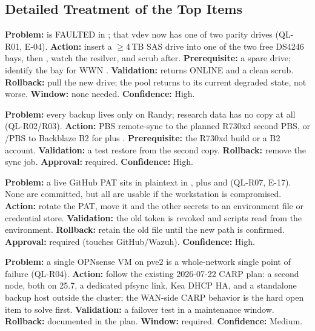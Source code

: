 \subsection{Detailed Treatment of the Top Items}

\begin{callout}[title=QL-REC01 - Replace the faulted bulk drive (Urgent)]
\textbf{Problem:}  is FAULTED in ; that vdev now has one of two parity drives (QL-R01, E-04). \textbf{Action:} insert a $\geq$4\,TB SAS drive into one of the two free DS4246 bays, then , watch the resilver, and scrub after. \textbf{Prerequisite:} a spare drive; identify the bay for WWN . \textbf{Validation:}  returns ONLINE and a clean scrub. \textbf{Rollback:} pull the new drive; the pool returns to its current degraded state, not worse. \textbf{Window:} none needed. \textbf{Confidence:} High.
\end{callout}

\begin{callout}[title=QL-REC03 - Add a second backup copy (Near-term)]
\textbf{Problem:} every backup lives only on Randy;  research data has no copy at all (QL-R02/R03). \textbf{Action:} PBS remote-sync to the planned R730xd second PBS, or /PBS to Backblaze B2 for  plus . \textbf{Prerequisite:} the R730xd build or a B2 account. \textbf{Validation:} a test restore from the second copy. \textbf{Rollback:} remove the sync job. \textbf{Approval:} required. \textbf{Confidence:} High.
\end{callout}

\begin{callout}[title=QL-REC05 - Rotate at-rest credentials on Ares (Urgent)]
\textbf{Problem:} a live GitHub PAT sits in plaintext in , plus  and  (QL-R07, E-17). None are committed, but all are usable if the workstation is compromised. \textbf{Action:} rotate the PAT, move it and the other secrets to an environment file or credential store. \textbf{Validation:} the old token is revoked and scripts read from the environment. \textbf{Rollback:} retain the old file until the new path is confirmed. \textbf{Approval:} required (touches GitHub/Wazuh). \textbf{Confidence:} High.
\end{callout}

\begin{callout}[title=QL-REC10 - OPNsense CARP HA pair (Medium-term)]
\textbf{Problem:} a single OPNsense VM on pve2 is a whole-network single point of failure (QL-R04). \textbf{Action:} follow the existing 2026-07-22 CARP plan: a second node, both on 25.7, a dedicated pfsync link, Kea DHCP HA, and a standalone backup host outside the cluster; the WAN-side CARP behavior is the hard open item to solve first. \textbf{Validation:} a failover test in a maintenance window. \textbf{Rollback:} documented in the plan. \textbf{Window:} required. \textbf{Confidence:} Medium.
\end{callout}

